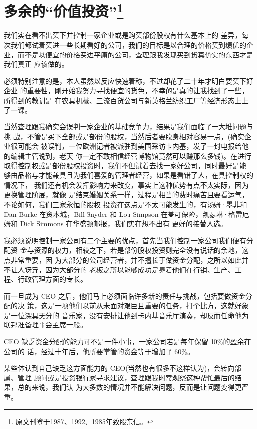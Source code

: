\documentclass[UTF8,a4paper,zihao=-4,fontset = windows]{ctexart} %
\begin{document}
\section[多余的“价值投资”]{多余的“价值投资”\footnote{原文刊登于1987、1992、1985年致股东信。}}

我们实在看不出买下并控制一家企业或是购买部份股权有什么基本上的
差异，每次我们都试着买进一些长期看好的公司，我们的目标是以合理的价格买到绩优的企
业，而不是以便宜的价格买进平庸的公司，查理跟我发现买到货真价实的东西才是我们真正
应该做的。

必须特别注意的是，本人虽然以反应快速着称，不过却花了二十年才明白要买下好企业
的重要性，刚开始我努力寻找便宜的货色，不幸的是真的让我找到了一些，所得到的教训是
在农具机械、三流百货公司与新英格兰纺织工厂等经济形态上上了一课。

当然查理跟我确实会误判一家企业的基础竞争力，结果是我们面临了一大堆问题与挑
战，不管是买下全部或是部份的股权，当然后者要脱身相对容易一点，(确实企业很可能会
被误判，一位欧洲记者被派驻到美国采访卡内基，发了一封电报给他的编辑主管说到，老天
你一定不敢相信经营博物馆竟然可以赚那么多钱)。在进行取得控制权或是部份股权投资时，我们不但试着去找一家好公司，同时最好是能
够由品格与才能兼具且为我们喜爱的管理者经营，如果是看错了人，在具控制权的情况下，
我们还有机会发挥影响力来改变，事实上这种优势有点不太实际，因为更换管理阶层，就像
是结束婚姻关系一样，过程是相当的费时痛苦且要看运气，不论如何，我们三家永恒的股权
投资在这点是不太可能发生的，有汤姆·墨菲和 Dan Burke 在资本城，Bill Snyder 和 Lou
Simpson 在盖可保险，凯瑟琳·格雷厄姆和 Dick Simmons 在华盛顿邮报，我们实在想不出有
更好的接替人选。

我必须说明控制一家公司有二个主要的优点，首先当我们控制一家公司我们便有分配资
金与资源的权力，相较之下，若是部份股权投资则完全没有说话的余地，这点非常重要，因
为大部分的公司经营者，并不擅长于做资金分配，之所以如此并不让人讶异，因为大部分的
老板之所以能够成功是靠着他们在行销、生产、工程、行政管理方面的专长。

而一旦成为 CEO 之后，他们马上必须面临许多新的责任与挑战，包括要做资金分配的决
策，这是一项他们以前从未面对艰巨且重要的任务，打个比方，这就好象是一位深具天分的
音乐家，没有安排让他到卡内基音乐厅演奏，却反而任命他为联邦准备理事会主席一般。

CEO 缺乏资金分配的能力可不是一件小事，一家公司若是每年保留 10\%的盈余在公司的
话，经过十年后，他所要掌管的资金等于增加了 60\%。

某些体认到自己缺乏这方面能力的 CEO(当然也有很多不这样认为)，会转向部属、管理
顾问或是投资银行家寻求建议，查理跟我时常观察这种帮忙最后的结果，总的来说，我们认
为大多数的情况并不能解决问题，反而是让问题变得更严重。
\end{document}
